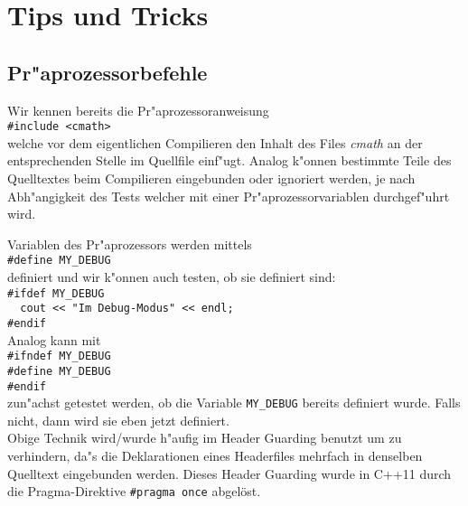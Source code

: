 \chapter{Tips und Tricks}
\label{p:13}
%
%

%
%
\section{Pr"aprozessorbefehle}
\label{p:13.1}
%
%
Wir kennen bereits die Pr"aprozessoranweisung
\\[0.5ex]
\verb|#include <cmath>|
\\[0.5ex]
welche vor dem eigentlichen Compilieren den Inhalt des Files 
\textit{cmath} an der entsprechenden Stelle im Quellfile einf"ugt. 
Analog k"onnen bestimmte Teile des Quelltextes beim Compilieren 
eingebunden oder ignoriert werden, je nach Abh"angigkeit des 
Tests %
welcher mit einer Pr"aprozessorvariablen durchgef"uhrt wird. 

Variablen des Pr"aprozessors werden mittels
\\[0.5ex]
\verb|#define MY_DEBUG|
\\[0.5ex]
definiert und wir k"onnen auch testen, ob sie definiert sind:
\\[0.5ex]
\verb|#ifdef MY_DEBUG|	\\
\verb|  cout << "Im Debug-Modus" << endl;|	\\
\verb|#endif|
\\[0.5ex]
Analog kann mit 
\\[0.5ex]
\verb|#ifndef MY_DEBUG|	\\
\verb|#define MY_DEBUG|	\\
\verb|#endif|
\\[0.5ex] 
zun"achst getestet werden, ob die Variable \verb|MY_DEBUG| 
bereits definiert wurde. Falls nicht, dann wird sie eben jetzt 
definiert. 
\\ 
Obige Technik wird/wurde h"aufig im Header Guarding benutzt um zu verhindern, da"s 
die Deklarationen eines Headerfiles mehrfach in denselben 
Quelltext eingebunden werden. 
Dieses Header Guarding wurde in C++11 durch die Pragma-Direktive 
\verb|#pragma once| abgelöst.

